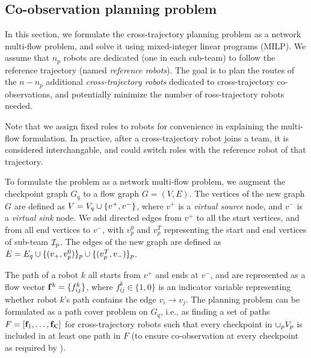 \documentclass[10pt,twocolumn,twoside]{IEEEtran}
\begin{document}

\subsection{Co-observation planning problem}
In this section, we formulate the cross-trajectory planning problem as a network multi-flow problem, and solve it using mixed-integer linear programs (MILP). We assume that $n_p$ robots are dedicated (one in each sub-team) to follow the reference trajectory (named \emph{reference robots}). The goal is to plan the routes of the $n-n_p$ additional \emph{cross-trajectory robots} dedicated to cross-trajectory co-observations, and potentially minimize the number of ross-trajectory robots needed. 

\begin{remark}
Note that we assign fixed roles to robots for convenience in explaining the multi-flow formulation. In practice, after a cross-trajectory robot joins a team, it is considered interchangable, and could switch roles with the reference robot of that trajectory. %
\end{remark}

To formulate the problem as a network multi-flow problem, we augment the checkpoint graph $G_{q}$ to a flow graph $G=(V, E)$. The vertices of the new graph $G$ are defined as $V= V_{q} \cup \{v^{+},v^{-}\}$, where $v^{+}$ is a \emph{virtual source} node, and $v^{-}$ is a \emph{virtual sink} node. We add directed edges from $v^{+}$ to all the start vertices, and from all end vertices to $v^{-}$, with $v^0_p$ and $v^T_p$ representing the start and end vertices of sub-team $\mathcal{I}_p$. The edges of the new graph are defined as $E = E_{q} \cup \{(v_{+},v^{0}_{p})\}_{p} \cup \{( v^{T}_{p},v_{-})\}_{p}$.

The path of a robot $k$ all starts from $v^{+}$ and ends at $v^{-}$, and are represented as a flow vector $\mathbf{f}^{k} = \{ f^{k}_{ij} \}$, where $f^{k}_{ij} \in \{1,0\}$ is an indicator variable representing whether robot $k$'s path contains the edge $v_{i}\to v_{j}$. The planning problem can be formulated as a path cover problem on $G_{q}$, i.e., as finding a set of paths $F=[\mathbf{f}_{1},\dots, \mathbf{f}_{\mathcal{K}}]$ for cross-trajectory robots such that every checkpoint in $\cup_p V_{p}$ is included in at least one path in $F$ (to ensure co-observation at every checkpoint as required by ). %
\end{document}

